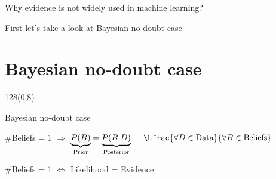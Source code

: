 \documentclass[shownotes]{beamer}
\begin{document}
\begin{frame}
 
 \vspace{1cm}
 
 \begin{center}
  \huge
  Why evidence is not widely used in machine learning?
 \end{center}

 \vspace{1cm}
\pause
 
 \begin{framed}
  \centering \large First let's take a look at Bayesian no-doubt case
 \end{framed}

  
 
 
\end{frame}



\section{Bayesian no-doubt case}

\begin{frame}
 \begin{textblock}{128}(0,8)
\begin{center}
 \Large Bayesian no-doubt case
\end{center}
\end{textblock}
\vspace{0.5cm}


 \begin{mdframed}[backgroundcolor=black!15]
 \centering
 $\#$Beliefs = 1 $\Longrightarrow$ $\underbrace{P(B)}_{\text{\scriptsize Prior}} = \underbrace{P(B|D)}_{\text{\scriptsize Posterior}} \ \ \ \ \hfrac{\forall D \in \text{Data}}{\forall B \in \text{Beliefs}}$
\end{mdframed}

 \vspace{0.9cm}
\pause 


\begin{mdframed}[backgroundcolor=black!15]
\centering
 $\#$Beliefs = 1  $\Longleftrightarrow$ Likelihood = Evidence  
\end{mdframed}
 

 

\end{frame}
\end{document}

